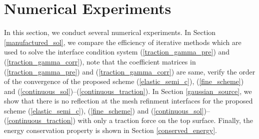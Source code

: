 \section{Numerical Experiments}
In this section, we conduct several numerical experiments. In Section \ref{manufactured_sol}, we compare the efficiency of iterative methods which are used to solve the interface condition system (\ref{traction_gamma_pre}) and (\ref{traction_gamma_corr}), note that the coefficient matrices in (\ref{traction_gamma_pre}) and (\ref{traction_gamma_corr}) are same, verify the order of the convergence of the proposed scheme (\ref{elastic_semi_c}), (\ref{fine_scheme}) and (\ref{continuous_sol})--(\ref{continuous_traction}). In Section \ref{gaussian_source}, we show that there is no reflection at the mesh refinment interfaces for the proposed scheme (\ref{elastic_semi_c}), (\ref{fine_scheme}) and (\ref{continuous_sol})--(\ref{continuous_traction}) with only a traction force on the top surface. Finally, the energy conservation property is shown in Section \ref{conserved_energy}.